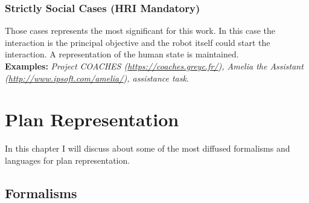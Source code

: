 \documentclass[pdftex,12pt,a4paper]{report}
\begin{document}
\subsection{Strictly Social Cases (HRI Mandatory)}
Those cases represents the most significant for this work. In this case the interaction is the principal objective and the robot itself could start the interaction. A representation of the human state is maintained.\\
\textbf{Examples:} \textit{Project COACHES (\url{https://coaches.greyc.fr/}), Amelia the Assistant (\url{http://www.ipsoft.com/amelia/}), assistance task}.


\chapter{Plan Representation}\label{sec:plan_repr}
In this chapter I will discuss about some of the most diffused formalisms and languages for plan representation.
\section{Formalisms}\label{sec:formalism}
\end{document}
